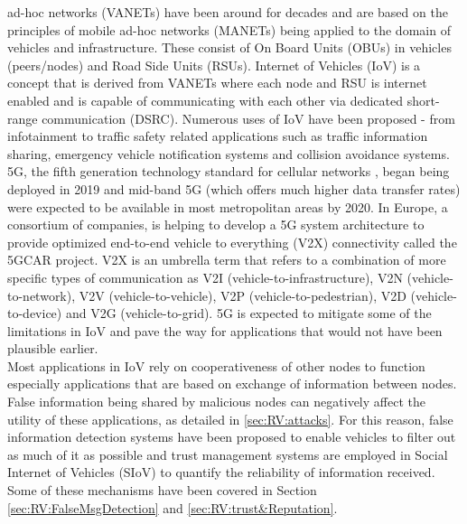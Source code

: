 \documentclass[journal]{IEEEtran}
\begin{document}
% 
% 
% 
% 
 ad-hoc networks (VANETs) have been around for decades and are based on the principles of mobile ad-hoc networks (MANETs) being applied to the domain of vehicles and infrastructure. These consist of On Board Units (OBUs) in vehicles (peers/nodes) and Road Side Units (RSUs). Internet of Vehicles (IoV) is a concept that is derived from VANETs where each node and RSU is internet enabled and is capable of communicating with each other via dedicated short-range communication (DSRC). Numerous uses of IoV have been proposed - from infotainment to traffic safety related applications such as traffic information sharing, emergency vehicle notification systems and collision avoidance systems.
\\5G, the fifth generation technology standard for cellular networks \cite{c:INTERNET_5garticle}, began being deployed in 2019 and mid-band 5G (which offers much higher data transfer rates) were expected to be available in most metropolitan areas by 2020. In Europe, a consortium of companies, is helping to develop a 5G system architecture to provide optimized end-to-end vehicle to everything (V2X) connectivity called the 5GCAR project.
V2X is an umbrella term that refers to a combination of more specific types of communication as V2I (vehicle-to-infrastructure), V2N (vehicle-to-network), V2V (vehicle-to-vehicle), V2P (vehicle-to-pedestrian), V2D (vehicle-to-device) and V2G (vehicle-to-grid). 5G is expected to mitigate some of the limitations in IoV and pave the way for applications that would not have been plausible earlier.
\\Most applications in IoV rely on cooperativeness of other nodes to function especially applications that are based on exchange of information between nodes. False information being shared by malicious nodes can negatively affect the utility of these applications, as detailed in \ref{sec:RV:attacks}. For this reason, false information detection systems have been proposed to enable vehicles to filter out as much of it as possible and trust management systems are employed in Social Internet of Vehicles (SIoV) to quantify the reliability of information received. Some of these mechanisms have been covered in Section \ref{sec:RV:FalseMsgDetection} and \ref{sec:RV:trust&Reputation}.
\end{document}
